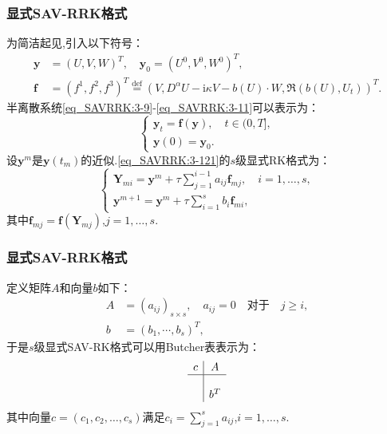 \documentclass[aspectratio=169]{beamer}
\numberwithin{theorem}{section} %
\numberwithin{equation}{section}%
\numberwithin{figure}{section}%
\numberwithin{table}{section}%
\begin{document}
\begin{frame}\frametitle{显式SAV-RRK格式}
		为简洁起见,引入以下符号：
		\begin{equation}
			\begin{aligned}
				\bm{y}&=\left(U,V,W\right)^T,\quad\bm{y}_0=\left(U^0,V^0,W^0\right)^T , \\
				\bm{f}&=(f^1,f^2,f^3)^T\overset{\text{def}}{=}(V,D^{\alpha} U-\mathrm{i}\kappa V-b(U)\cdot W,\Re\left(b(U), U_t\right))^T.
			\end{aligned}
		\end{equation}
		半离散系统\eqref{eq_SAVRRK:3-9}-\eqref{eq_SAVRRK:3-11}可以表示为：
		{\color{purple}\begin{equation}
\left\{\begin{array}{l}
\bm{y}_t=\bm{f}(\bm{y}),\quad t \in(0, T],\\
\bm{y}(0)=\bm{y}_0.
\end{array}\right.\label{eq_SAVRRK:3-121}
\end{equation}}
设$\bm{y}^m$是$\bm{y}\left(t_m\right)$的近似.\eqref{eq_SAVRRK:3-121}的$s$级显式RK格式\cite{hairerRungeKuttaMethods2015}为：
\begin{equation}
\left\{\begin{array}{l}
\bm{Y}_{m i}=\bm{y}^m+\tau \sum\limits_{j=1}^{i-1} a_{i j} \bm{f}_{m j}, \quad i=1, \ldots, s, \\
\bm{y}^{m+1}=\bm{y}^m+\tau \sum\limits_{i=1}^s b_i \bm{f}_{m i},
\end{array}\right.\label{eq_SAVRRK:4-31}
\end{equation}
其中$\bm{f}_{m j}=\bm{f}\left(\bm{Y}_{m j}\right)$,$j=1, \ldots, s$.
	\end{frame}

\begin{frame}\frametitle{显式SAV-RRK格式}
	定义矩阵$A$和向量$b$如下：
	\begin{equation}
	\begin{aligned}
	A & =\left(a_{i j}\right)_{s \times s}, \quad a_{i j}=0 \quad \text {对于} \quad j \geq i, \\
	b & =\left(b_1, \cdots, b_s\right)^T,
	\end{aligned}
	\end{equation}
	于是$s$级显式SAV-RK格式可以用Butcher表表示为：
	\begin{equation}
	\begin{array}{c|c}
	c & A \\
	\hline \\
	& b^T
	\end{array}
	\end{equation}
	其中向量$c=(c_1,c_2,\dots,c_s)$满足$c_i=\sum\limits_{j=1}^s a_{i j}$,$i=1, \ldots, s$.
\end{frame}
\end{document}
